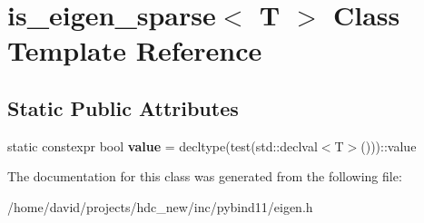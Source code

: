 \hypertarget{classis__eigen__sparse}{}\section{is\+\_\+eigen\+\_\+sparse$<$ T $>$ Class Template Reference}
\label{classis__eigen__sparse}
\subsection*{Static Public Attributes}
\begin{DoxyCompactItemize}
\item 
static constexpr bool {\bfseries value} = decltype(test(std\+::declval$<$T$>$()))\+::value\hypertarget{classis__eigen__sparse_a48fb081afa88c391ea5ba90e2ef7d6ea}{}\label{classis__eigen__sparse_a48fb081afa88c391ea5ba90e2ef7d6ea}

\end{DoxyCompactItemize}


The documentation for this class was generated from the following file\+:\begin{DoxyCompactItemize}
\item 
/home/david/projects/hdc\+\_\+new/inc/pybind11/eigen.\+h\end{DoxyCompactItemize}

